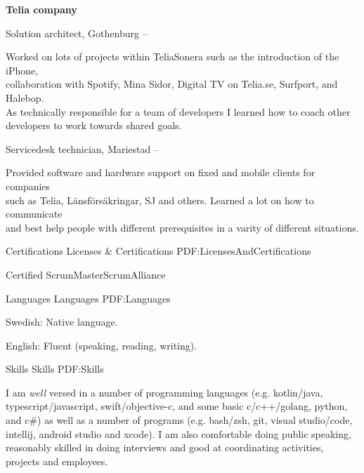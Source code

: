 \documentclass[letterpaper,MMMyyyy,nonstopmode]{simpleresumecv}
\begin{document}
\begin{Body}
\BigGap
\Entry
\textbf{Telia company}

\Gap
\BulletItem
Solution architect, Gothenburg
\hfill
{} --

\begin{Detail}
\SubBulletItem
Worked on lots of projects within TeliaSonera such as the introduction of the iPhone,\\collaboration with Spotify, Mina Sidor, Digital TV on Telia.se, Surfport, and Halebop.\\As technically responsible for a team of developers I learned how to coach other\\developers to work towards shared goals.
\end{Detail}

\Gap
\BulletItem
Servicedesk technician, Mariestad
\hfill
{} --

\begin{Detail}
\SubBulletItem
Provided software and hardware support on fixed and mobile clients for companies\\ such as Telia, Länsförsäkringar, SJ and others. Learned a lot on how to communicate\\ and best help people with different prerequisites in a varity of different situations.
\end{Detail}



\Section
{Certifications}
{Licenses \& Certifications}
{PDF:LicensesAndCertifications}

\BulletItem
Certified ScrumMaster\newline ScrumAlliance
\hfill
{}


\Section
{Languages}
{Languages}
{PDF:Languages}

\BulletItem
Swedish: Native language.

\Gap
\BulletItem
English: Fluent (speaking, reading, writing).


\Section
{Skills}
{Skills}
{PDF:Skills}

\Entry
I am \emph{well} versed in a number of programming languages (e.g. kotlin/java, typescript/javascript, swift/objective-c, and some basic c/c++/golang, python, and c\#) as well as a number of programs (e.g. bash/zsh, git, visual studio/code, intellij, android studio and xcode). I am also comfortable doing public speaking, reasonably skilled in doing interviews and good at coordinating activities, projects and employees.


\end{Body}
\end{document}
